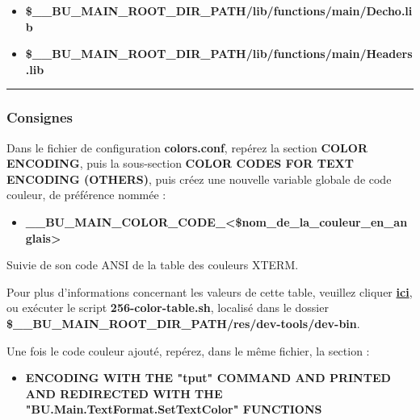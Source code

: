 \documentclass[a4paper,10pt]{article}
\begin{document}
    \begin{itemize}
        \item \textbf{\color{vars}\$\_\_BU\_MAIN\_ROOT\_DIR\_PATH\color{path}/lib/functions/main/Decho.lib}
        \item \textbf{\color{vars}\$\_\_BU\_MAIN\_ROOT\_DIR\_PATH\color{path}/lib/functions/main/Headers.lib}\\[1\baselineskip]
    \end{itemize}



    \color{sec3}\par\noindent\rule{\textwidth}{0.4pt}\color{text}

    \color{sec3}
    \subsubsection{Consignes}\color{text}

    \begin{justify}
        Dans le fichier de configuration \textbf{\color{path}colors.conf}, repérez la section \textbf{COLOR ENCODING}, puis la sous-section \textbf{COLOR CODES FOR TEXT ENCODING (OTHERS)}, puis créez une nouvelle variable globale de code couleur, de préférence nommée :

        \begin{itemize}
            \item \textbf{\color{vars}\_\_BU\_MAIN\_COLOR\_CODE\_<\$nom\_de\_la\_couleur\_en\_anglais>}
        \end{itemize}
    \end{justify}

    \begin{justify}
        Suivie de son code ANSI de la table des couleurs XTERM.
    \end{justify}

    \begin{justify}
        Pour plus d'informations concernant les valeurs de cette table, veuillez cliquer \href{https://unix.stackexchange.com/questions/269077/tput-setaf-color-table-how-to-determine-color-codes/269085#269085}{\textbf{ici}}, ou exécuter le script \textbf{\color{path}256-color-table.sh}, localisé dans le dossier \textbf{\color{vars}\$\_\_BU\_MAIN\_ROOT\_DIR\_PATH\color{path}/res/dev-tools/dev-bin}.
    \end{justify}

    \begin{justify}
        Une fois le code couleur ajouté, repérez, dans le même fichier, la section :

        \begin{itemize}
            \item \textbf{ENCODING WITH THE "tput" COMMAND AND PRINTED AND REDIRECTED WITH THE\\ "BU.Main.TextFormat.SetTextColor" FUNCTIONS}
        \end{itemize}
    \end{justify}
\end{document}
